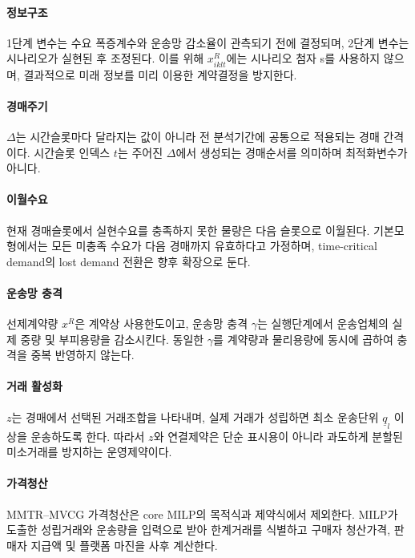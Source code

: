 \documentclass[11pt,a4paper]{article}
\begin{document}
\paragraph{정보구조} 1단계 변수는 수요 폭증계수와 운송망 감소율이 관측되기 전에 결정되며, 2단계 변수는 시나리오가 실현된 후 조정된다. 이를 위해 $x^R_{iklt}$에는 시나리오 첨자 s를 사용하지 않으며, 결과적으로 미래 정보를 미리 이용한 계약결정을 방지한다.

\paragraph{경매주기} $\Delta$는 시간슬롯마다 달라지는 값이 아니라 전 분석기간에 공통으로 적용되는 경매 간격이다. 시간슬롯 인덱스 $t$는 주어진 $\Delta$에서 생성되는 경매순서를 의미하며 최적화변수가 아니다.

\paragraph{이월수요} 현재 경매슬롯에서 실현수요를 충족하지 못한 물량은 다음 슬롯으로 이월된다. 기본모형에서는 모든 미충족 수요가 다음 경매까지 유효하다고 가정하며, time-critical demand의 lost demand 전환은 향후 확장으로 둔다.

\paragraph{운송망 충격} 선제계약량 $x^R$은 계약상 사용한도이고, 운송망 충격 $\gamma$는 실행단계에서 운송업체의 실제 중량 및 부피용량을 감소시킨다. 동일한 $\gamma$를 계약량과 물리용량에 동시에 곱하여 충격을 중복 반영하지 않는다.

\paragraph{거래 활성화} $z$는 경매에서 선택된 거래조합을 나타내며, 실제 거래가 성립하면 최소 운송단위 $\underline q_l$ 이상을 운송하도록 한다. 따라서 $z$와 연결제약은 단순 표시용이 아니라 과도하게 분할된 미소거래를 방지하는 운영제약이다.

\paragraph{가격청산} MMTR--MVCG 가격청산은 core MILP의 목적식과 제약식에서 제외한다. MILP가 도출한 성립거래와 운송량을 입력으로 받아 한계거래를 식별하고 구매자 청산가격, 판매자 지급액 및 플랫폼 마진을 사후 계산한다.
\end{document}
